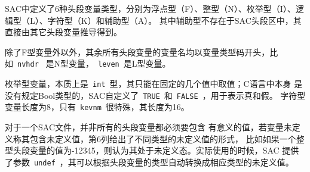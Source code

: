 SAC中定义了6种头段变量类型，分别为浮点型（F）、整型（N）、枚举型（I）、逻辑型（L）、字符型（K）和辅助型（A）。
其中辅助型不存在于SAC头段区中，其直接由其它头段变量推导得到。

除了F型变量外以外，其余所有头段变量的变量名均以变量类型码开头，比如~\verb+nvhdr+~
是N型变量，~\verb+leven+~是L型变量。

枚举型变量，本质上是~\verb+int+~型，其只能在固定的几个值中取值；C语言中本身
是没有规定Bool类型的，SAC自定义了~\verb+TRUE+~和~\verb+FALSE+~，用于表示真和假。
字符型变量长度为8，只有~\verb+kevnm+~很特殊，其长度为16。

对于一个SAC文件，并非所有的头段变量都必须要包含
有意义的值，若变量未定义称其包含未定义值，第6列给出了不同类型的未定义值的形式，
比如如果一个整型头段变量的值为-12345，则认为其处于未定义态。实际使用的时候，SAC
提供了参数~\verb+undef+~，其可以根据头段变量的类型自动转换成相应类型的未定义值。
